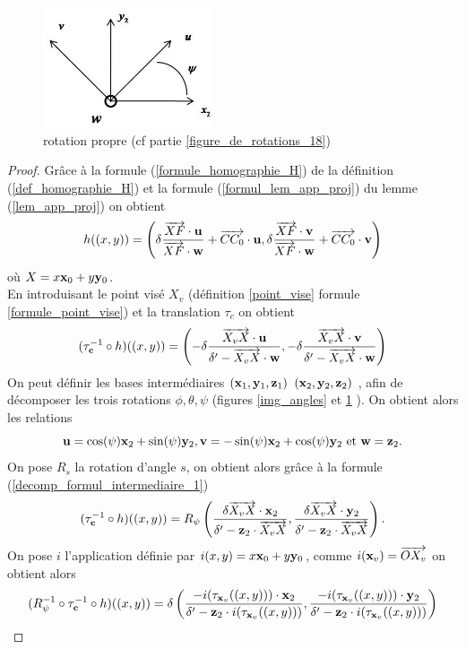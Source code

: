 \begin{figure}[h!]
\centering
\includegraphics[width=5cm]{graphe3.jpg}
\caption{rotation propre (cf partie \ref{figure_de_rotations_18})}
\label{decompgeo_rotationPropre}
\end{figure}

\begin{proof}
Grâce à la formule (\ref{formule_homographie_H}) de la définition (\ref{def_homographie_H}) et la formule  (\ref{formul_lem_app_proj}) du lemme (\ref{lem_app_proj}) on obtient
\begin{equation*}
h((x,y))=\left( \delta \frac{\overrightarrow{XF}\cdot \mathbf{u}}{\overrightarrow{XF} \cdot \mathbf{w}} +\overrightarrow{CC_0 } \cdot \mathbf{u}, \delta \frac{\overrightarrow{XF}\cdot \mathbf{v}}{\overrightarrow{XF} \cdot  \mathbf{w}}+\overrightarrow{CC_0 }\cdot \mathbf{v} \right)
\end{equation*}
où $X=x \mathbf{x}_0 + y \mathbf{y}_0 $.\\
En introduisant le point visé $X_v$ (définition \ref{point_vise} formule \ref{formule_point_vise}) et la translation $\tau_c$ on obtient 
\begin{equation}
(\tau_{\mathbf{c}}^{-1} \circ h)((x,y)) = \left ( -\delta \frac{\overrightarrow{X_vX}\cdot \mathbf{u}}{\delta' -\overrightarrow{X_vX} \cdot \mathbf{w}},-\delta \frac{\overrightarrow{X_vX}\cdot \mathbf{v}}{\delta' -\overrightarrow{X_vX} \cdot \mathbf{w}} \right)
\label{decomp_formul_intermediaire_1}
\end{equation}
On peut définir les bases intermédiaires $(\mathbf{x}_1 ,\mathbf{y}_1 ,\mathbf{z}_1)$  $(\mathbf{x}_2 ,\mathbf{y}_2 ,\mathbf{z}_2)$ , afin de décomposer les trois rotations $\phi,\theta,\psi$ (figures \ref{img_angles} et \ref{decompgeo_rotationPropre} ).
On obtient alors les relations
\begin{equation*}
\mathbf{u}=\cos(\psi)\mathbf{x}_{2}+\sin(\psi)\mathbf{y}_{2} , \mathbf{v}=-\sin(\psi)\mathbf{x}_{2}+\cos(\psi)\mathbf{y}_{2} \text{ et } \mathbf{w}=\mathbf{z}_2.
\end{equation*}
On pose $R_{s}$ la rotation d'angle $s$, on obtient alors grâce à la formule (\ref{decomp_formul_intermediaire_1}) 
\begin{equation*}
(\tau_{\mathbf{c}}^{-1} \circ h)((x,y)) = R_{\psi}\left(\frac{\delta \overrightarrow{X_v X}\cdot \mathbf{x}_{2} }{\delta'-\mathbf{z}_2 \cdot \overrightarrow{X_v X}},\frac{\delta \overrightarrow{X_v X}\cdot \mathbf{y}_{2}}{\delta'-\mathbf{z}_2 \cdot \overrightarrow{X_v X}}  \right).
\end{equation*}
On pose $i$ l'application définie par $i(x,y)=x \mathbf{x}_0 + y \mathbf{y}_0$, comme $i(\mathbf{x}_v)=\overrightarrow{O X_v}$ on obtient alors 
\begin{equation*}
(R_{\psi}^{-1} \circ \tau_{\mathbf{c}}^{-1}  \circ h)((x,y))=\delta \left(\frac{-i(\tau_{\mathbf{x}_v} ((x,y)))\cdot \mathbf{x}_{2} }{\delta'-\mathbf{z}_2 \cdot i(\tau_{\mathbf{x}_v} ((x,y)))},\frac{-i(\tau_{\mathbf{x}_v} ((x,y)))\cdot \mathbf{y}_{2}}{\delta'-\mathbf{z}_2 \cdot i(\tau_{\mathbf{x}_v} ((x,y)))}  \right) 
\end{equation*}


\end{proof}
